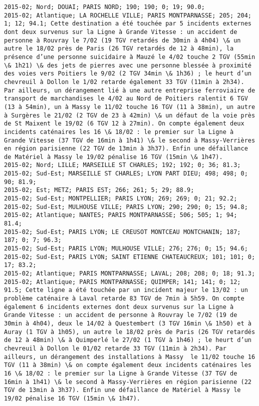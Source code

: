 \documentclass{article}
\begin{document}
\begin{Verbatim}[commandchars=\\\{\}]
2015-02; Nord; DOUAI; PARIS NORD; 190; 190; 0; 19; 90.0; 
2015-02; Atlantique; LA ROCHELLE VILLE; PARIS MONTPARNASSE; 205; 204; 1; 12; 94.1; Cette destination a été touchée par 5 incidents externes dont deux survenus sur la Ligne à Grande Vitesse : un accident de personne à Rouvray le 7/02 (19 TGV retardés de 30min à 4h04) \& un autre le 18/02 près de Paris (26 TGV retardés de 12 à 48min), la présence d’une personne suicidaire à Mauzé le 4/02 touche 2 TGV (55min \& 1h21) \& des jets de pierres avec une personne blessée à proximité des voies vers Poitiers le 9/02 (2 TGV 34min \& 1h36) ; le heurt d’un chevreuil à Dollon le 1/02 retarde également 33 TGV (11min à 2h34). Par ailleurs, un dérangement lié à une autre entreprise ferroviaire de transport de marchandises le 4/02 au Nord de Poitiers ralentit 6 TGV (13 à 54min), un à Massy le 11/02 touche 16 TGV (11 à 38min), un autre à Surgères le 21/02 (2 TGV de 23 à 42min) \& un défaut de la voie près de St Maixent le 19/02 (6 TGV 12 à 27min). On compte également deux incidents caténaires les 16 \& 18/02 : le premier sur la Ligne à Grande Vitesse (37 TGV de 16min à 1h41) \& le second à Massy-Verrières en région parisienne (22 TGV de 13min à 3h37). Enfin une défaillance de Matériel à Massy le 19/02 pénalise 16 TGV (15min \& 1h47).
2015-02; Nord; LILLE; MARSEILLE ST CHARLES; 192; 192; 0; 36; 81.3; 
2015-02; Sud-Est; MARSEILLE ST CHARLES; LYON PART DIEU; 498; 498; 0; 90; 81.9; 
2015-02; Est; METZ; PARIS EST; 266; 261; 5; 29; 88.9; 
2015-02; Sud-Est; MONTPELLIER; PARIS LYON; 269; 269; 0; 21; 92.2; 
2015-02; Sud-Est; MULHOUSE VILLE; PARIS LYON; 290; 290; 0; 15; 94.8; 
2015-02; Atlantique; NANTES; PARIS MONTPARNASSE; 506; 505; 1; 94; 81.4; 
2015-02; Sud-Est; PARIS LYON; LE CREUSOT MONTCEAU MONTCHANIN; 187; 187; 0; 7; 96.3; 
2015-02; Sud-Est; PARIS LYON; MULHOUSE VILLE; 276; 276; 0; 15; 94.6; 
2015-02; Sud-Est; PARIS LYON; SAINT ETIENNE CHATEAUCREUX; 101; 101; 0; 17; 83.2; 
2015-02; Atlantique; PARIS MONTPARNASSE; LAVAL; 208; 208; 0; 18; 91.3; 
2015-02; Atlantique; PARIS MONTPARNASSE; QUIMPER; 141; 141; 0; 12; 91.5; Cette ligne a été touchée par un incident majeur le 13/02 : un problème caténaire à Laval retarde 83 TGV de 7min à 5h59. On compte également 6 incidents externes dont deux survenus sur la Ligne à Grande Vitesse : un accident de personne à Rouvray le 7/02 (19 de 30min à 4h04), deux le 14/02 à Questembert (3 TGV 16min \& 1h50) et à Auray (1 TGV à 1h05), un autre le 18/02 près de Paris (26 TGV retardés de 12 à 48min) \& à Quimperlé le 27/02 (1 TGV à 1h46) ; le heurt d’un chevreuil à Dollon le 01/02 retarde 33 TGV (11min à 2h34). Par ailleurs, un dérangement des installations à Massy  le 11/02 touche 16 TGV (11 à 38min) \& on compte également deux incidents caténaires les 16 \& 18/02 : le premier sur la Ligne à Grande Vitesse (37 TGV de 16min à 1h41) \& le second à Massy-Verrières en région parisienne (22 TGV de 13min à 3h37). Enfin une défaillance de Matériel à Massy le 19/02 pénalise 16 TGV (15min \& 1h47).

\end{Verbatim}
\end{document}
